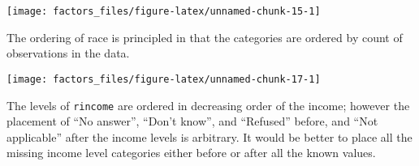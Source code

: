 \documentclass[]{book}
\newenvironment{Shaded}{\begin{snugshade}}{\end{snugshade}}
\newcommand{\CommentTok}[1]{\textcolor[rgb]{0.56,0.35,0.01}{\textit{#1}}}
\newcommand{\DataTypeTok}[1]{\textcolor[rgb]{0.13,0.29,0.53}{#1}}
\newcommand{\KeywordTok}[1]{\textcolor[rgb]{0.13,0.29,0.53}{\textbf{#1}}}
\newcommand{\NormalTok}[1]{#1}
\newcommand{\OperatorTok}[1]{\textcolor[rgb]{0.81,0.36,0.00}{\textbf{#1}}}
\newcommand{\OtherTok}[1]{\textcolor[rgb]{0.56,0.35,0.01}{#1}}
\newcommand{\StringTok}[1]{\textcolor[rgb]{0.31,0.60,0.02}{#1}}
\theoremstyle{plain}
\theoremstyle{remark}
\begin{document}
\begin{Shaded}
\end{Shaded}

\begin{center}\texttt{[image: factors\_files/figure-latex/unnamed-chunk-15-1]} \end{center}

The ordering of race is principled in that the categories are ordered by
count of observations in the data.

\begin{Shaded}
\end{Shaded}

\begin{Shaded}
\end{Shaded}

\begin{center}\texttt{[image: factors\_files/figure-latex/unnamed-chunk-17-1]} \end{center}

The levels of \texttt{rincome} are ordered in decreasing order of the
income; however the placement of ``No answer'', ``Don't know'', and
``Refused'' before, and ``Not applicable'' after the income levels is
arbitrary. It would be better to place all the missing income level
categories either before or after all the known values.

\begin{Shaded}
\end{Shaded}
\end{document}
